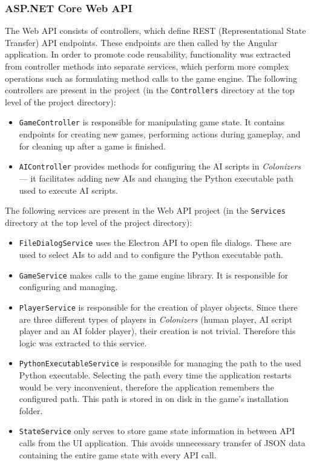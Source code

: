 \subsubsection{ASP.NET Core Web API}

The Web API consists of controllers, which define REST (Representational
State Transfer) API endpoints. These endpoints are then called by the Angular
application. In order to promote code reusability, functionality was extracted
from controller methods into separate services, which perform more complex operations
such as formulating method calls to the game engine. The following controllers
are present in the project (in the \texttt{Controllers} directory at the top level
of the project directory):
\begin{itemize}
    \item \texttt{GameController} is responsible for manipulating game state.
        It contains endpoints for creating new games, performing actions during
        gameplay, and for cleaning up after a game is finished.
    \item \texttt{AIController} provides methods for configuring the AI
        scripts in \emph{Colonizers} --- it facilitates adding new AIs
        and changing the Python executable path used to execute AI scripts.
\end{itemize}

The following services are present in the Web API project (in the \texttt{Services}
directory at the top level of the project directory):
\begin{itemize}
    \item \texttt{FileDialogService} uses the Electron API to open
        file dialogs. These are used to select AIs to add and to
        configure the Python executable path.
    \item \texttt{GameService} makes calls to the game engine library.
        It is responsible for configuring and managing.
    \item \texttt{PlayerService} is responsible for the creation of player
        objects. Since there are three different types of players
        in \emph{Colonizers} (human player, AI script player and an AI folder player),
        their creation is not trivial. Therefore this logic was extracted to this
        service.
    \item \texttt{PythonExecutableService} is responsible for managing
        the path to the used Python executable. Selecting the path every
        time the application restarts would be very inconvenient, therefore
        the application remembers the configured path. This path is stored
        in on disk in the game's installation folder.
    \item \texttt{StateService} only serves to store game state information
        in between API calls from the UI application. This avoids
        unnecessary transfer of JSON data containing the entire game
        state with every API call.
\end{itemize}

